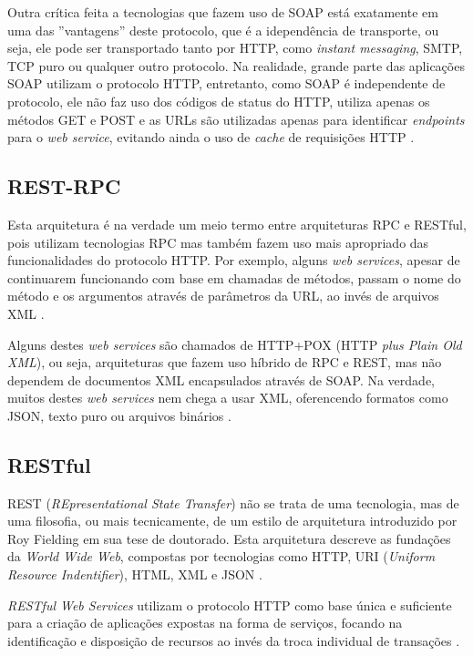 \documentclass[diss]{template/setrem}
\begin{document}
Outra crítica feita a tecnologias que fazem uso de SOAP está exatamente em uma das ''vantagens'' deste protocolo, que é a idependência de transporte, ou seja, ele pode ser transportado tanto por HTTP, como \emph{instant messaging}, SMTP, TCP puro ou qualquer outro protocolo. Na realidade, grande parte das aplicações SOAP utilizam o protocolo HTTP, entretanto, como SOAP é independente de protocolo, ele não faz uso dos códigos de status do HTTP, utiliza apenas os métodos GET e POST e as URLs são utilizadas apenas para identificar \emph{endpoints} para o \emph{web service}, evitando ainda o uso de \emph{cache} de requisições HTTP \citep{Richardson2007}.

\subsection{REST-RPC}
Esta arquitetura é na verdade um meio termo entre arquiteturas RPC e RESTful, pois utilizam tecnologias RPC mas também fazem uso mais apropriado das funcionalidades do protocolo HTTP. Por exemplo, alguns \emph{web services}, apesar de continuarem funcionando com base em chamadas de métodos, passam o nome do método e os argumentos através de parâmetros da URL, ao invés de arquivos XML \citep{Richardson2007}.

Alguns destes \emph{web services} são chamados de HTTP+POX (HTTP \emph{plus Plain Old XML}), ou seja, arquiteturas que fazem uso híbrido de RPC e REST, mas não dependem de documentos XML encapsulados através de SOAP. Na verdade, muitos destes \emph{web services} nem chega a usar XML, oferencendo formatos como JSON, texto puro ou arquivos binários \citep{Richardson2007}.

\subsection{RESTful}
\label{subsec:restful}
REST (\emph{REpresentational State Transfer}) não se trata de uma tecnologia, mas de uma filosofia, ou mais tecnicamente, de um estilo de arquitetura introduzido por Roy Fielding em sua tese de doutorado. Esta arquitetura descreve as fundações da \emph{World Wide Web}, compostas por tecnologias como HTTP, URI (\emph{Uniform Resource Indentifier}), HTML, XML e JSON \citep{Allamaraju2010}.

\emph{RESTful Web Services} utilizam o protocolo HTTP como base única e suficiente para a criação de aplicações expostas na forma de serviços, focando na identificação e disposição de recursos ao invés da troca individual de transações \citep{Bean2010, Gorton2011}.
\end{document}
